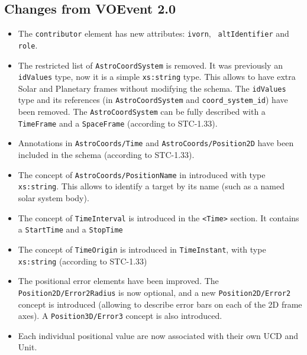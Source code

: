 \documentclass[11pt,a4paper]{ivoa}
\begin{document}
\subsection{Changes from VOEvent 2.0}
\label{appendix:last-changes}
\begin{itemize}
\item The {\tt contributor} element has new attributes: {\tt ivorn}, {\tt 
altIdentifier} and {\tt role}. 
\item The restricted list of {\tt AstroCoordSystem} is removed. It was 
previously an {\tt idValues} type, now it is a simple {\tt xs:string} type. 
This allows to have extra Solar and Planetary frames without modifying the 
schema. The {\tt idValues} type and its references (in {\tt AstroCoordSystem} 
and {\tt coord\_system\_id}) have been removed. The {\tt AstroCoordSystem} can 
be fully described with a {\tt TimeFrame} and a {\tt SpaceFrame}  (according to 
STC-1.33).
\item Annotations in {\tt AstroCoords/Time} and {\tt AstroCoords/Position2D} 
have been included in the schema (according to STC-1.33).
\item The concept of {\tt AstroCoords/PositionName} in introduced with type {\tt
xs:string}. This allows to identify a target by its name (such as a named solar
system body). 
\item The concept of {\tt TimeInterval} is introduced in the {\tt <Time>} 
section. It contains a {\tt StartTime} and a {\tt StopTime}
\item The concept of {\tt TimeOrigin} is introduced in {\tt TimeInstant}, with 
type {\tt xs:string} (according to STC-1.33)
\item The positional error elements have been improved. The {\tt 
Position2D/Error2Radius} is now optional, and a new {\tt Position2D/Error2} 
concept is introduced (allowing to describe error bars on each of the 2D frame 
axes). A {\tt Position3D/Error3} concept is also introduced.
\item Each individual positional value are now associated with their own UCD 
and Unit. 
\end{itemize}
\end{document}
